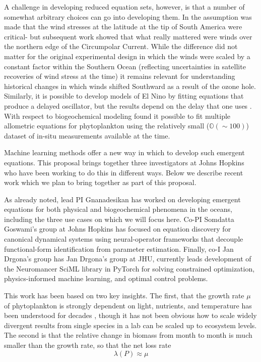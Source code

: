 \documentclass{article}
\begin{document}
A challenge in developing reduced equation sets, however, is that a number of somewhat arbitrary choices can go into developing them. In \cite{gnanadesikan1999simple} the assumption was made that the wind stresses at the latitude at the tip of South America were critical- but subsequent work \citep{allison2010winds} showed that what really mattered were winds over the northern edge of the Circumpolar Current. While the difference did not matter for the original experimental design in which the winds were scaled by a constant factor within the Southern Ocean (reflecting uncertainties in satellite recoveries of wind stress at the time) it remains relevant for understanding historical changes in which winds shifted Southward as a result of the ozone hole. Similarly, it is possible to develop models of El Nino by fitting equations that produce a delayed oscillator, but the results depend on the delay that one uses \citep{russell2006southern}. With respect to biogeochemical modeling \cite{dunne2005empirical} found it possible to fit multiple allometric equations for phytoplankton using the relatively small ($\mathbb{O}(\sim 100)$) dataset of in-situ measurements available at the time. 

Machine learning methods offer a new way in which to develop such emergent equations. This proposal brings together three investigators at Johns Hopkins who have been working to do this in different ways. Below we describe recent work which we plan to bring together as part of this proposal. 

As already noted, lead PI Gnanadesikan has worked on developing emergent equations for both physical and biogeochemical phenomena in the oceans, including the three use cases on which we will focus here.  Co-PI Somdatta Goswami's group at Johns Hopkins has focused on equation discovery for canonical dynamical systems using neural-operator frameworks that decouple functional-form identification from parameter estimation. Finally, co-I Jan Drgona's group has Jan Drgona's group at JHU, currently leads development of the  Neuromancer SciML library \citep{drgona2023domain} in PyTorch for solving constrained optimization, physics-informed machine learning, and optimal control problems.

This work has been based on two key insights. The first, that the growth rate $\mu$ of phytoplankton is strongly dependent on light, nutrients, and temperature has been understood for decades \citep{riley1949volume}, though it has not been obvious how to scale widely divergent results from single species in a lab can be scaled up to ecosystem levels. The second is that the relative change in biomass from month to month is much smaller than the growth rate, so that the net loss rate 
$$
\lambda(P)\approx \mu
$$
 
\end{document}

